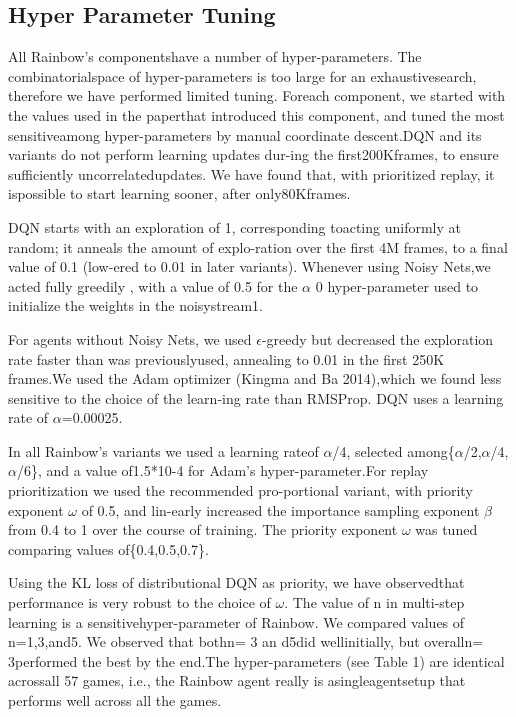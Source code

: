 \documentclass{article}
\begin{document}
\subsection{Hyper Parameter Tuning}

\quad All   Rainbow’s   componentshave  a  number  of  hyper-parameters.  The  combinatorialspace  of  hyper-parameters  is  too  large  for  an  exhaustivesearch,  therefore  we  have  performed  limited  tuning.  Foreach component, we started with the values used in the paperthat introduced this component, and tuned the most sensitiveamong hyper-parameters by manual coordinate descent.DQN and its variants do not perform learning updates dur-ing the first200Kframes, to ensure sufficiently uncorrelatedupdates.  We  have  found  that,  with  prioritized  replay,  it  ispossible to start learning sooner, after only80Kframes.

DQN starts with an exploration of 1, corresponding toacting uniformly at random; it anneals the amount of explo-ration over the first 4M frames, to a final value of 0.1 (low-ered to 0.01 in later variants). Whenever using Noisy Nets,we acted fully greedily , with a value of 0.5 for the $\alpha$ 0 hyper-parameter used to initialize the weights in the noisystream1. 

For agents without Noisy Nets, we used $\epsilon$-greedy but decreased the exploration rate faster than was previouslyused, annealing to 0.01 in the first 250K frames.We  used  the  Adam  optimizer  (Kingma  and  Ba  2014),which  we  found  less  sensitive  to  the  choice  of  the  learn-ing rate than RMSProp. DQN uses a learning rate of $\alpha$=0.00025.

In all Rainbow’s variants we used a learning rateof $\alpha$/4,  selected  among\{$\alpha$/2,$\alpha$/4,$\alpha$/6\},  and  a  value  of1.5*10-4 for Adam’s hyper-parameter.For replay prioritization we used the recommended pro-portional variant, with priority exponent $\omega$ of 0.5, and lin-early increased the importance sampling exponent $\beta$ from 0.4 to 1 over the course of training. The priority exponent $\omega$ was tuned comparing values of\{0.4,0.5,0.7\}. 

Using the KL loss of distributional DQN as priority, we have observedthat performance is very robust to the choice of $\omega$. The  value  of n in  multi-step  learning  is  a  sensitivehyper-parameter of Rainbow. We compared values of n=1,3,and5. We observed that bothn=  3 an d5did wellinitially, but overalln= 3performed the best by the end.The hyper-parameters (see Table 1) are identical acrossall 57 games, i.e., the Rainbow agent really is asingleagentsetup that performs well across all the games.
\end{document}
